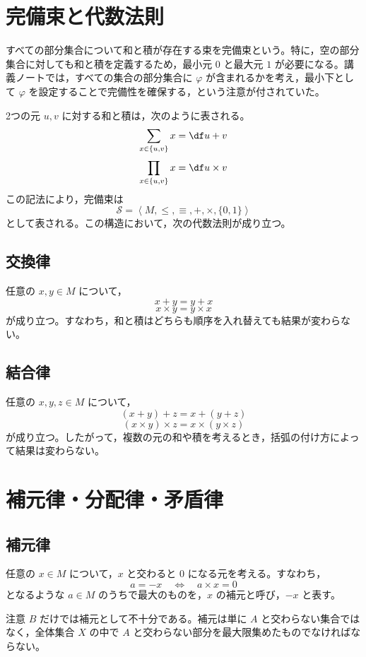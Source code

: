 \documentclass[../main.tex]{subfiles}
\begin{document}
\section{完備束と代数法則}

すべての部分集合について和と積が存在する束を完備束という。特に，空の部分集合に対しても和と積を定義するため，最小元 \(0\) と最大元 \(1\) が必要になる。講義ノートでは，すべての集合の部分集合に \(\varphi\) が含まれるかを考え，最小下として \(\varphi\) を設定することで完備性を確保する，という注意が付されていた。

2つの元 \(u,v\) に対する和と積は，次のように表される。
\[
  \sum_{x \in \{u,v\}} x
  =
  \df
  u+v
\]
\[
  \prod_{x \in \{u,v\}} x
  =
  \df
  u \times v
\]
この記法により，完備束は
\[
  \mathcal{S}
  =
  \left\langle
    M,\leq,\equiv,+,\times,\{0,1\}
  \right\rangle
\]
として表される。この構造において，次の代数法則が成り立つ。

\subsection{交換律}

任意の \(x,y \in M\) について，
\[
  x+y = y+x
\]
\[
  x \times y = y \times x
\]
が成り立つ。すなわち，和と積はどちらも順序を入れ替えても結果が変わらない。

\subsection{結合律}

任意の \(x,y,z \in M\) について，
\[
  (x+y)+z = x+(y+z)
\]
\[
  (x \times y) \times z = x \times (y \times z)
\]
が成り立つ。したがって，複数の元の和や積を考えるとき，括弧の付け方によって結果は変わらない。

\section{補元律・分配律・矛盾律}

\subsection{補元律}

任意の \(x \in M\) について，\(x\) と交わると \(0\) になる元を考える。すなわち，
\[
  a = -x
  \quad \Leftrightarrow \quad
  a \times x = 0
\]
となるような \(a \in M\) のうちで最大のものを，\(x\) の補元と呼び，\(-x\) と表す。

\begin{sidebox}[TBred]{注意}
  \(B\) だけでは補元として不十分である。補元は単に \(A\) と交わらない集合ではなく，全体集合 \(X\) の中で \(A\) と交わらない部分を最大限集めたものでなければならない。
\end{sidebox}
\end{document}
